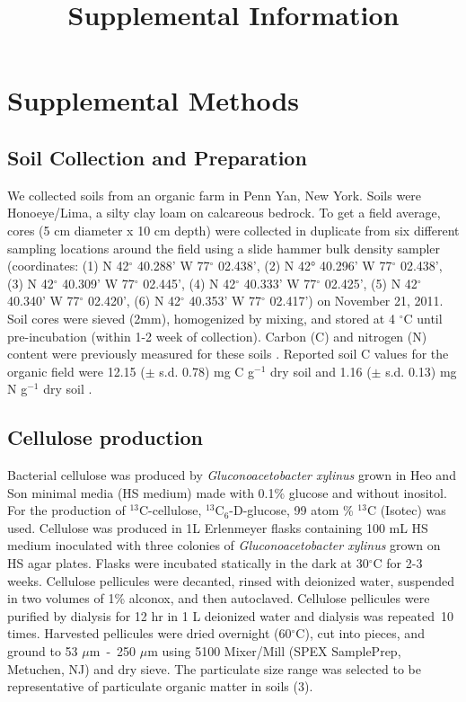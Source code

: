 \documentclass{article}
\title{Supplemental Information}
\date{\vspace{-5ex}}
\begin{document}
\maketitle

\tableofcontents



\section{Supplemental Methods}\label{SI} 

\subsection{Soil Collection and Preparation} 
We collected soils from an organic farm in Penn Yan, New York. Soils were
Honoeye/Lima, a silty clay loam on calcareous bedrock. To get a field average,
cores (5 cm diameter x 10 cm depth) were collected in duplicate from six
different sampling locations around the field using a slide hammer bulk density
sampler (coordinates: (1) N 42$^{\circ}$ 40.288’ W 77$^{\circ}$ 02.438’, (2)
N 42° 40.296’ W 77$^{\circ}$ 02.438’, (3) N 42$^{\circ}$ 40.309’ W 77$^{\circ}$
02.445’, (4) N 42$^{\circ}$ 40.333’ W 77$^{\circ}$ 02.425’, (5) N 42$^{\circ}$
   40.340’ W 77$^{\circ}$ 02.420’, (6) N 42$^{\circ}$ 40.353’ W 77$^{\circ}$
      02.417’) on November 21,
2011. Soil cores were sieved (2mm), homogenized by mixing, and stored at
      4 $^{\circ}$C until pre-incubation (within 1-2 week of collection).
        Carbon (C) and nitrogen (N) content were previously measured for these
        soils \citep{Berthrong_2013}. Reported soil C values for the organic
        field were
12.15 ($\pm$ s.d. 0.78) mg C g$^{-1}$ dry soil and 1.16 ($\pm$ s.d. 0.13) mg
   N g$^{-1}$ dry soil \citep{Berthrong_2013}. 

\subsection{Cellulose production}
Bacterial cellulose was produced by \textit{Gluconoacetobacter xylinus} grown
in Heo and Son \citep{Heo_2002} minimal media (HS medium) made with 0.1\%
glucose and without inositol.  For the production of $^{13}$C-cellulose,
$^{13}$C$_{6}$-D-glucose, 99 atom \% $^{13}$C (Isotec) was used. Cellulose
was produced in 1L Erlenmeyer flasks containing 100 mL HS medium inoculated
with three colonies of \textit{Gluconoacetobacter xylinus} grown on HS agar
plates. Flasks were incubated statically in the dark at 30$^{\circ}$C for 2-3
weeks. Cellulose pellicules were decanted, rinsed with deionized water,
suspended in two volumes of 1\% alconox, and then autoclaved. Cellulose
pellicules were purified by dialysis for 12 hr in 1 L deionized water and
dialysis was repeated~10 times. Harvested pellicules were dried overnight
(60$^{\circ}$C), cut into pieces, and ground to 53 $\mu$m~-~250 $\mu$m using
5100 Mixer/Mill (SPEX SamplePrep, Metuchen, NJ) and dry sieve. The particulate
size range was selected to be representative of particulate organic matter in
soils (3).
\end{document}
